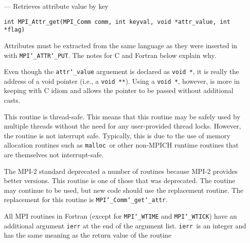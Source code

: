 \startmanpage
{}
--- Retrieves attribute value by key 
\startvb\begin{verbatim}
int MPI_Attr_get(MPI_Comm comm, int keyval, void *attr_value, int *flag)

\end{verbatim}
\endvb

\par
{}
\par
{}
Attributes must be extracted from the same language as they were inserted
in with {\tt MPI{\tt \char`\_}ATTR{\tt \char`\_}PUT}.  The notes for C and Fortran below explain why.
\par
{}
Even though the {\tt attr{\tt \char`\_}value} arguement is declared as {\tt void *}, it is
really the address of a void pointer (i.e., a {\tt void **}).  Using
a {\tt void *}, however, is more in keeping with C idiom and allows the
pointer to be passed without additional casts.
\par
\par
{}
\par
This routine is thread-safe.  This means that this routine may be
safely used by multiple threads without the need for any user-provided
thread locks.  However, the routine is not interrupt safe.  Typically,
this is due to the use of memory allocation routines such as {\tt malloc
}or other non-MPICH runtime routines that are themselves not interrupt-safe.
\par
{}
The MPI-2 standard deprecated a number of routines because MPI-2 provides
better versions.  This routine is one of those that was deprecated.  The
routine may continue to be used, but new code should use the replacement
routine.
The replacement for this routine is {\tt MPI{\tt \char`\_}Comm{\tt \char`\_}get{\tt \char`\_}attr}.
\par
{}
All MPI routines in Fortran (except for {\tt MPI{\tt \char`\_}WTIME} and {\tt MPI{\tt \char`\_}WTICK}) have
an additional argument {\tt ierr} at the end of the argument list.  {\tt ierr
}is an integer and has the same meaning as the return value of the routine
